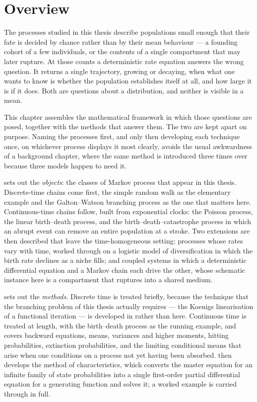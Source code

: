 \section{Overview}
\label{m:sec:overview}

The processes studied in this thesis describe populations small enough that their
fate is decided by chance rather than by their mean behaviour --- a founding cohort
of a few individuals, or the contents of a single compartment that may later
rupture. At those counts a deterministic rate equation answers the wrong question.
It returns a single trajectory, growing or decaying, when what one wants to know is
whether the population establishes itself at all, and how large it is if it does.
Both are questions about a distribution, and neither is visible in a mean.

This chapter assembles the mathematical framework in which those questions are
posed, together with the methods that answer them. The two are kept apart on
purpose. Naming the processes first, and only then developing each technique once,
on whichever process displays it most clearly, avoids the usual awkwardness of a
background chapter, where the same method is introduced three times over because
three models happen to need it.

 sets out the \emph{objects}: the classes of Markov process that
appear in this thesis. Discrete-time chains come first, the simple random walk as
the elementary example and the Galton--Watson branching process as the one that
matters here. Continuous-time chains follow, built from exponential clocks: the
Poisson process, the linear birth--death process, and the
birth--death--catastrophe process in which an abrupt event can remove an entire
population at a stroke. Two extensions are then described that leave the
time-homogeneous setting: processes whose rates vary with time, worked through on a
logistic model of diversification in which the birth rate declines as a niche fills;
and coupled systems in which a deterministic differential equation and a Markov chain
each drive the other, whose schematic instance here is a compartment that ruptures
into a shared medium.

 sets out the \emph{methods}. Discrete time is treated briefly,
because the technique that the branching problem of this thesis actually requires
--- the Koenigs linearisation of a functional iteration --- is developed in \ChA{}
rather than here. Continuous time is treated at length, with the birth--death
process as the running example, and covers backward equations, means, variances and
higher moments, hitting probabilities, extinction probabilities, and the limiting
conditional means that arise when one conditions on a process not yet having been
absorbed.  then develops the method of characteristics, which
converts the master equation for an infinite family of state probabilities into a
single first-order partial differential equation for a generating function and
solves it; a worked example is carried through in full.

